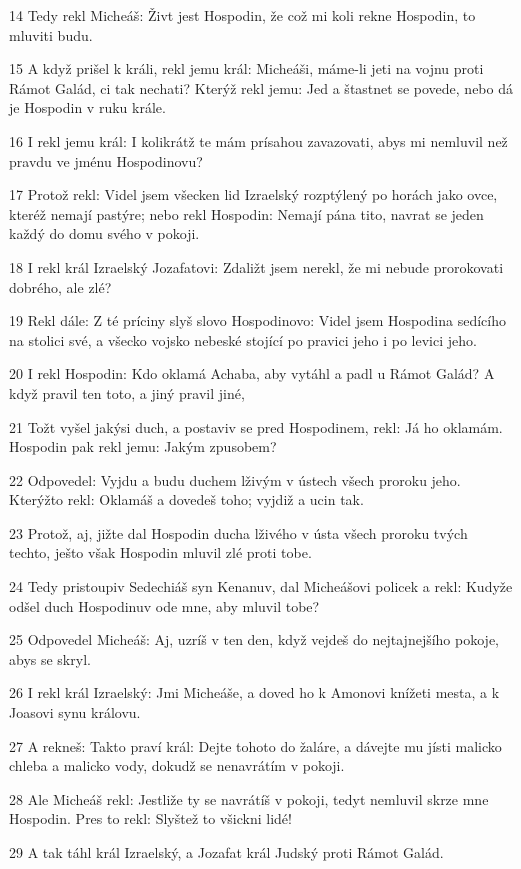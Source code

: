 \par 14 Tedy rekl Micheáš: Živt jest Hospodin, že což mi koli rekne Hospodin, to mluviti budu.
\par 15 A když prišel k králi, rekl jemu král: Micheáši, máme-li jeti na vojnu proti Rámot Galád, ci tak nechati? Kterýž rekl jemu: Jed a štastnet se povede, nebo dá je Hospodin v ruku krále.
\par 16 I rekl jemu král: I kolikrátž te mám prísahou zavazovati, abys mi nemluvil než pravdu ve jménu Hospodinovu?
\par 17 Protož rekl: Videl jsem všecken lid Izraelský rozptýlený po horách jako ovce, kteréž nemají pastýre; nebo rekl Hospodin: Nemají pána tito, navrat se jeden každý do domu svého v pokoji.
\par 18 I rekl král Izraelský Jozafatovi: Zdaližt jsem nerekl, že mi nebude prorokovati dobrého, ale zlé?
\par 19 Rekl dále: Z té príciny slyš slovo Hospodinovo: Videl jsem Hospodina sedícího na stolici své, a všecko vojsko nebeské stojící po pravici jeho i po levici jeho.
\par 20 I rekl Hospodin: Kdo oklamá Achaba, aby vytáhl a padl u Rámot Galád? A když pravil ten toto, a jiný pravil jiné,
\par 21 Tožt vyšel jakýsi duch, a postaviv se pred Hospodinem, rekl: Já ho oklamám. Hospodin pak rekl jemu: Jakým zpusobem?
\par 22 Odpovedel: Vyjdu a budu duchem lživým v ústech všech proroku jeho. Kterýžto rekl: Oklamáš a dovedeš toho; vyjdiž a ucin tak.
\par 23 Protož, aj, jižte dal Hospodin ducha lživého v ústa všech proroku tvých techto, ješto však Hospodin mluvil zlé proti tobe.
\par 24 Tedy pristoupiv Sedechiáš syn Kenanuv, dal Micheášovi policek a rekl: Kudyže odšel duch Hospodinuv ode mne, aby mluvil tobe?
\par 25 Odpovedel Micheáš: Aj, uzríš v ten den, když vejdeš do nejtajnejšího pokoje, abys se skryl.
\par 26 I rekl král Izraelský: Jmi Micheáše, a doved ho k Amonovi knížeti mesta, a k Joasovi synu královu.
\par 27 A rekneš: Takto praví král: Dejte tohoto do žaláre, a dávejte mu jísti malicko chleba a malicko vody, dokudž se nenavrátím v pokoji.
\par 28 Ale Micheáš rekl: Jestliže ty se navrátíš v pokoji, tedyt nemluvil skrze mne Hospodin. Pres to rekl: Slyštež to všickni lidé!
\par 29 A tak táhl král Izraelský, a Jozafat král Judský proti Rámot Galád.
